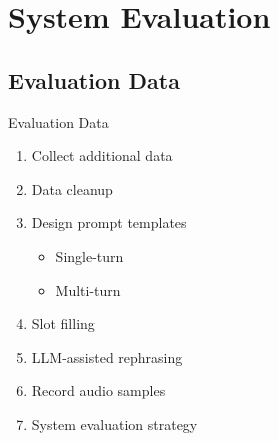 \documentclass{sdqbeamer}[smallfoot]
\begin{document}
\section{System Evaluation}
\subsection{Evaluation Data}
\begin{frame}{Evaluation Data}
    \begin{enumerate}
        \item Collect additional data
        \item Data cleanup
        \item Design prompt templates
            \begin{itemize}
                \item Single-turn
                \item Multi-turn
            \end{itemize}
        \item Slot filling
        \item LLM-assisted rephrasing
        \item Record audio samples
        \item System evaluation strategy
    \end{enumerate}
\end{frame}
\end{document}
